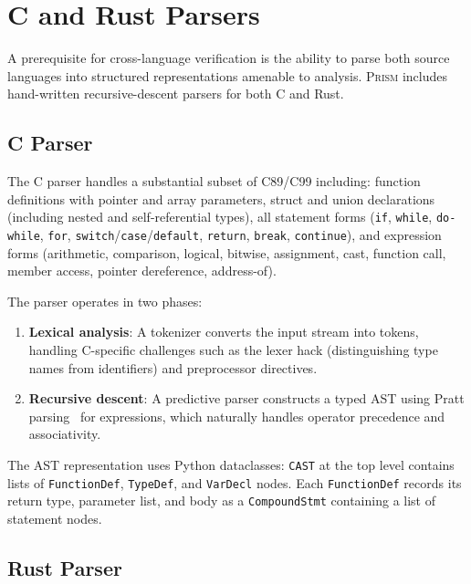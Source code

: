 \documentclass[11pt,a4paper]{article}
\begin{document}
\section{C and Rust Parsers}\label{sec:parsers}

A prerequisite for cross-language verification is the ability to parse
both source languages into structured representations amenable to
analysis. \textsc{Prism} includes hand-written recursive-descent parsers
for both C and Rust.

\subsection{C Parser}\label{sec:cparser}

The C parser handles a substantial subset of C89/C99 including:
function definitions with pointer and array parameters, struct and
union declarations (including nested and self-referential types),
all statement forms (\texttt{if}, \texttt{while}, \texttt{do-while},
\texttt{for}, \texttt{switch}/\texttt{case}/\texttt{default},
\texttt{return}, \texttt{break}, \texttt{continue}), and expression
forms (arithmetic, comparison, logical, bitwise, assignment, cast,
function call, member access, pointer dereference, address-of).

The parser operates in two phases:
\begin{enumerate}
  \item \textbf{Lexical analysis}: A tokenizer converts the input stream
    into tokens, handling C-specific challenges such as the lexer hack
    (distinguishing type names from identifiers) and preprocessor
    directives.
  \item \textbf{Recursive descent}: A predictive parser constructs
    a typed AST using Pratt parsing~\cite{pratt1973top} for expressions,
    which naturally handles operator precedence and associativity.
\end{enumerate}

The AST representation uses Python dataclasses:
\texttt{CAST} at the top level contains lists of \texttt{FunctionDef},
\texttt{TypeDef}, and \texttt{VarDecl} nodes. Each \texttt{FunctionDef}
records its return type, parameter list, and body as a
\texttt{CompoundStmt} containing a list of statement nodes.

\subsection{Rust Parser}\label{sec:rustparser}
\end{document}
